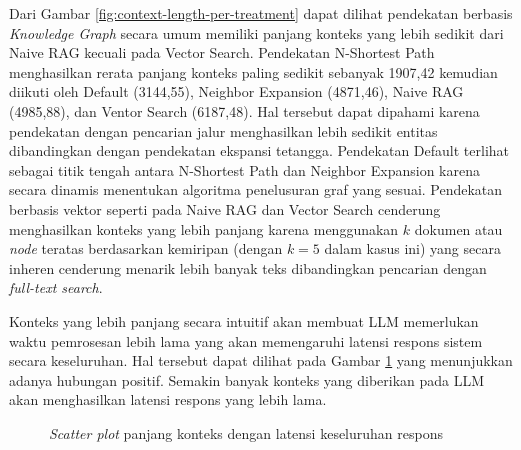 Dari Gambar \ref{fig:context-length-per-treatment} dapat dilihat pendekatan berbasis \textit{Knowledge Graph} secara umum memiliki panjang konteks yang lebih sedikit dari Naive RAG kecuali pada Vector Search.
Pendekatan N-Shortest Path menghasilkan rerata panjang konteks paling sedikit sebanyak 1907,42 kemudian diikuti oleh Default (3144,55), Neighbor Expansion (4871,46), Naive RAG (4985,88), dan Ventor Search (6187,48).
Hal tersebut dapat dipahami karena pendekatan dengan pencarian jalur menghasilkan lebih sedikit entitas dibandingkan dengan pendekatan ekspansi tetangga.
Pendekatan Default terlihat sebagai titik tengah antara N-Shortest Path dan Neighbor Expansion karena secara dinamis menentukan algoritma penelusuran graf yang sesuai.
Pendekatan berbasis vektor seperti pada Naive RAG dan Vector Search cenderung menghasilkan konteks yang lebih panjang karena menggunakan $k$ dokumen atau \textit{node} teratas berdasarkan kemiripan (dengan $k=5$ dalam kasus ini) yang secara inheren cenderung menarik lebih banyak teks dibandingkan pencarian dengan \textit{full-text search}.

Konteks yang lebih panjang secara intuitif akan membuat LLM memerlukan waktu pemrosesan lebih lama yang akan memengaruhi latensi respons sistem secara keseluruhan.
Hal tersebut dapat dilihat pada Gambar \ref{fig:context-length-vs-latency} yang menunjukkan adanya hubungan positif.
Semakin banyak konteks yang diberikan pada LLM akan menghasilkan latensi respons yang lebih lama.

\begin{figure}[H]
	\centering
	\caption{\textit{Scatter plot} panjang konteks dengan latensi keseluruhan respons}
	\label{fig:context-length-vs-latency}
\end{figure}
